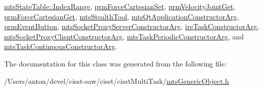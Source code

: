 \hyperlink{classmts_state_table_1_1_index_range_aee1ef0cd5b41b955416cce4212dd398d}{mts\+State\+Table\+::\+Index\+Range}, \hyperlink{classprm_force_cartesian_set_a5cddf5bcd6c9663b7e435c4b9bddf1af}{prm\+Force\+Cartesian\+Set}, \hyperlink{classprm_velocity_joint_get_aa30c7cd787323214de8f7b1775af95d8}{prm\+Velocity\+Joint\+Get}, \hyperlink{classprm_force_cartesian_get_ab632a651988b5cdb45b04e386ca29f45}{prm\+Force\+Cartesian\+Get}, \hyperlink{classmts_stealth_tool_a6bfabcb3bee465c02dc9c42578dfd220}{mts\+Stealth\+Tool}, \hyperlink{classmts_qt_application_constructor_arg_adab540a9de65d898b488a3628bf46bf3}{mts\+Qt\+Application\+Constructor\+Arg}, \hyperlink{classprm_event_button_a2811ddd9856b125f561d9e71dae541b0}{prm\+Event\+Button}, \hyperlink{classmts_socket_proxy_server_constructor_arg_a3555d9c68b3ce38590adc22c3e0d2755}{mts\+Socket\+Proxy\+Server\+Constructor\+Arg}, \hyperlink{classire_task_constructor_arg_a5418e8c1dfd71d99f789b615c9eed5d6}{ire\+Task\+Constructor\+Arg}, \hyperlink{classmts_socket_proxy_client_constructor_arg_a3b8e88637fd8afe325d30bf365e1e612}{mts\+Socket\+Proxy\+Client\+Constructor\+Arg}, \hyperlink{classmts_task_periodic_constructor_arg_a4820a784c730fdb160090b77675485e8}{mts\+Task\+Periodic\+Constructor\+Arg}, and \hyperlink{classmts_task_continuous_constructor_arg_a2cdec03572448b0e6783ca3c07bf3b93}{mts\+Task\+Continuous\+Constructor\+Arg}.



The documentation for this class was generated from the following file\+:\begin{DoxyCompactItemize}
\item 
/\+Users/anton/devel/cisst-\/saw/cisst/cisst\+Multi\+Task/\hyperlink{mts_generic_object_8h}{mts\+Generic\+Object.\+h}\end{DoxyCompactItemize}
